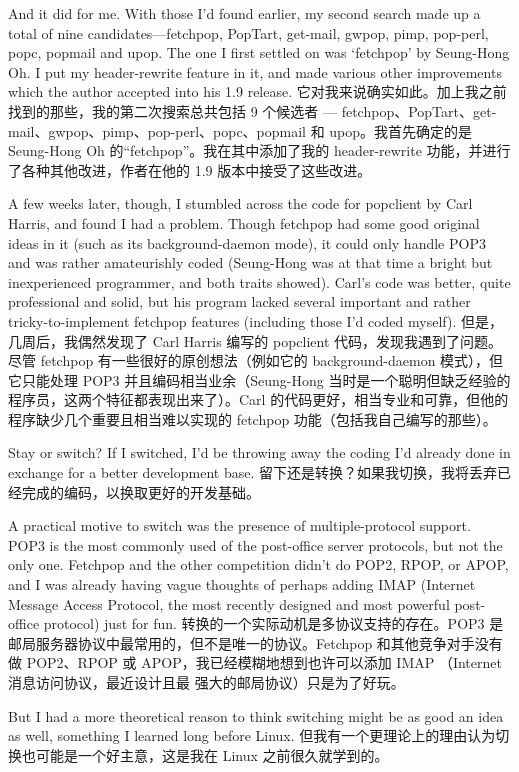 \documentclass[a4paper,12pt,UTF8,twoside]{ctexbook}
\begin{document}
And it did for me. With those I'd found earlier, my second search made up a total of nine candidates—fetchpop, PopTart, get-mail, gwpop, pimp, pop-perl, popc, popmail and upop. The one I first settled on was `fetchpop' by Seung-Hong Oh. I put my header-rewrite feature in it, and made various other improvements which the author accepted into his 1.9 release.
它对我来说确实如此。加上我之前找到的那些，我的第二次搜索总共包括 9 个候选者 — fetchpop、PopTart、get-mail、gwpop、pimp、pop-perl、popc、popmail 和 upop。我首先确定的是 Seung-Hong Oh 的“fetchpop”。我在其中添加了我的 header-rewrite 功能，并进行了各种其他改进，作者在他的 1.9 版本中接受了这些改进。

A few weeks later, though, I stumbled across the code for popclient by Carl Harris, and found I had a problem. Though fetchpop had some good original ideas in it (such as its background-daemon mode), it could only handle POP3 and was rather amateurishly coded (Seung-Hong was at that time a bright but inexperienced programmer, and both traits showed). Carl's code was better, quite professional and solid, but his program lacked several important and rather tricky-to-implement fetchpop features (including those I'd coded myself).
但是，几周后，我偶然发现了 Carl Harris 编写的 popclient 代码，发现我遇到了问题。尽管 fetchpop 有一些很好的原创想法（例如它的 background-daemon 模式），但它只能处理 POP3 并且编码相当业余（Seung-Hong 当时是一个聪明但缺乏经验的程序员，这两个特征都表现出来了）。Carl 的代码更好，相当专业和可靠，但他的程序缺少几个重要且相当难以实现的 fetchpop 功能（包括我自己编写的那些）。

Stay or switch? If I switched, I'd be throwing away the coding I'd already done in exchange for a better development base.
留下还是转换？如果我切换，我将丢弃已经完成的编码，以换取更好的开发基础。

A practical motive to switch was the presence of multiple-protocol support. POP3 is the most commonly used of the post-office server protocols, but not the only one. Fetchpop and the other competition didn't do POP2, RPOP, or APOP, and I was already having vague thoughts of perhaps adding IMAP (Internet Message Access Protocol, the most recently designed and most powerful post-office protocol) just for fun.
转换的一个实际动机是多协议支持的存在。POP3 是邮局服务器协议中最常用的，但不是唯一的协议。Fetchpop 和其他竞争对手没有做 POP2、RPOP 或 APOP，我已经模糊地想到也许可以添加 IMAP （Internet 消息访问协议，最近设计且最 强大的邮局协议）只是为了好玩。

But I had a more theoretical reason to think switching might be as good an idea as well, something I learned long before Linux.
但我有一个更理论上的理由认为切换也可能是一个好主意，这是我在 Linux 之前很久就学到的。
\end{document}
